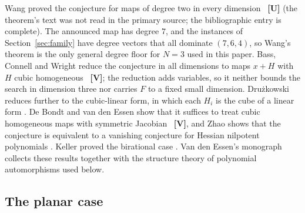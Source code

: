 \documentclass[11pt]{article}
\theoremstyle{definition}
\theoremstyle{remark}
\newcommand{\VV}{\textbf{[V]}}
\newcommand{\UU}{\textbf{[U]}}
\begin{document}
Wang proved the conjecture for maps of degree two in every dimension \cite{Wang1980}~\UU{} (the
theorem's text was not read in the primary source; the bibliographic entry is complete). The announced map has degree
$7$, and the instances of Section~\ref{sec:family} have degree vectors that all dominate $(7,6,4)$, so Wang's theorem is the only
general degree floor for $N = 3$ used in this paper. Bass, Connell and Wright reduce the conjecture in all dimensions to maps
$x + H$ with $H$ cubic homogeneous \cite{BCW1982}~\VV{}; the reduction adds variables, so it neither bounds the search in
dimension three nor carries $F$ to a fixed small dimension. Dru\.zkowski reduces further to the cubic-linear form, in which each
$H_i$ is the cube of a linear form \cite{Druzkowski1983}. De Bondt and van den Essen show that it suffices to treat cubic
homogeneous maps with symmetric Jacobian \cite{dBvdE2005}~\VV{}, and Zhao shows that the conjecture is equivalent to a vanishing
conjecture for Hessian nilpotent polynomials \cite{Zhao2004, Zhao2007}. Keller proved the birational case
\cite{Keller1939}. Van den Essen's monograph \cite{vdEssen2000} collects these results together with the structure theory of
polynomial automorphisms used below.

\subsection{The planar case}
\end{document}
